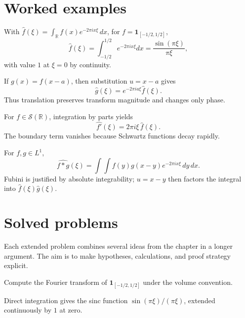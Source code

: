 \section{Worked examples}

\begin{example}\label{ex:iii11-worked-01}
With
\(\widehat f(\xi)=\int_{\mathbb R}f(x)e^{-2\pi ix\xi}\,dx\), for
\(f=\mathbf1_{[-1/2,1/2]}\),
\[
\widehat f(\xi)=\int_{-1/2}^{1/2}e^{-2\pi ix\xi}dx
=\frac{\sin(\pi\xi)}{\pi\xi},
\]
with value \(1\) at \(\xi=0\) by continuity.
\end{example}

\begin{example}\label{ex:iii11-worked-02}
If \(g(x)=f(x-a)\), then substitution \(u=x-a\) gives
\[
\widehat g(\xi)=e^{-2\pi ia\xi}\widehat f(\xi).
\]
Thus translation preserves transform magnitude and changes only phase.
\end{example}

\begin{example}\label{ex:iii11-worked-03}
For \(f\in\mathcal S(\mathbb R)\), integration by parts yields
\[
\widehat{f'}(\xi)=2\pi i\xi\,\widehat f(\xi).
\]
The boundary term vanishes because Schwartz functions decay rapidly.
\end{example}

\begin{example}\label{ex:iii11-worked-04}
For \(f,g\in L^1\),
\[
\widehat{f*g}(\xi)
=\int\!\!\int f(y)g(x-y)e^{-2\pi ix\xi}\,dy\,dx.
\]
Fubini is justified by absolute integrability; \(u=x-y\) then factors the
integral into \(\widehat f(\xi)\widehat g(\xi)\).
\end{example}

\section{Solved problems}
Each extended problem combines several ideas from the chapter in a longer argument. The aim is to make hypotheses, calculations, and proof strategy explicit.

\begin{problem}\label{prob:iii11-problem-01}
Compute the Fourier transform of \(\mathbf1_{[-1/2,1/2]}\) under the volume convention.
\end{problem}
\begin{solution}
Direct integration gives the sinc function
\(\sin(\pi\xi)/(\pi\xi)\), extended continuously by \(1\) at zero.
\end{solution}


